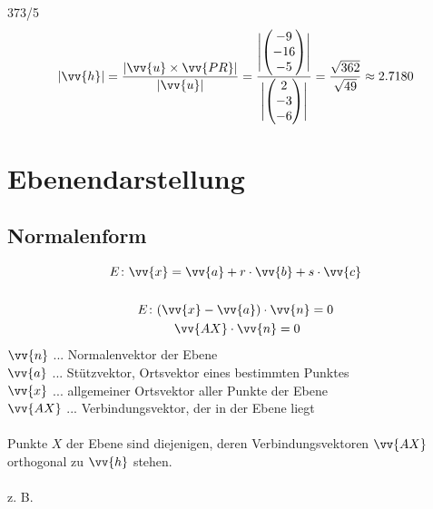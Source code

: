 \begin{exercise}{373/5}
\begin{gather*}
    |\vv{h}| = \frac{|\vv{u} \times \vv{PR}|}{|\vv{u}|} = \frac{\Biggl|\begin{pmatrix}-9 \\ -16 \\ -5\end{pmatrix}\Biggr|}{\Biggl|\begin{pmatrix}2 \\ -3 \\ -6\end{pmatrix}\Biggr|} = \frac{\sqrt{362}}{\sqrt{49}} \approx 2.7180
  \end{gather*}
\end{exercise}
\section{Ebenendarstellung}
\subsection{Normalenform}
\begin{gather*}
  E \colon \vv{x} = \vv{a} + r \cdot \vv{b} + s \cdot \vv{c} \\\\
  E \colon (\vv{x} - \vv{a}) \cdot \vv{n} = 0 \\
  \; \vv{AX} \cdot \vv{n} = 0
\end{gather*}
$\vv{n}$ ... Normalenvektor der Ebene \\
$\vv{a}$ ... Stützvektor, Ortsvektor eines bestimmten Punktes \\
$\vv{x}$ ... allgemeiner Ortsvektor aller Punkte der Ebene \\
$\vv{AX}$ ... Verbindungsvektor, der in der Ebene liegt \\\\
Punkte $X$ der Ebene sind diejenigen, deren Verbindungsvektoren $\vv{AX}$ orthogonal zu $\vv{h}$ stehen. \\\\
z. B.
